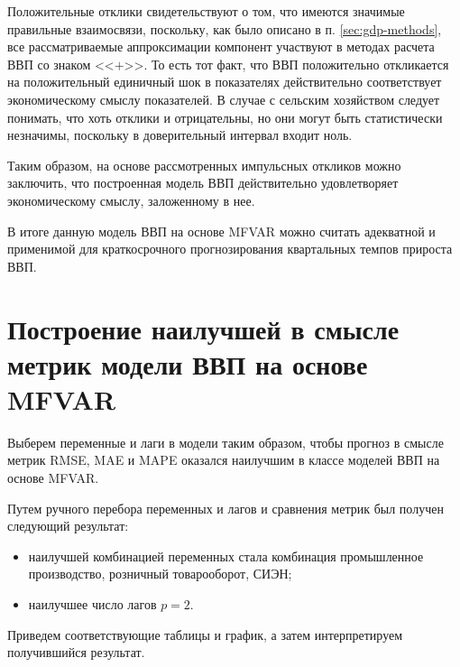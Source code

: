 \documentclass[a4paper, 14pt]{extreport}
\numberwithin{equation}{section}
\numberwithin{equation}{section}
\begin{document}
	Положительные отклики свидетельствуют о том, что имеются значимые правильные взаимосвязи, поскольку, как было описано в п. \ref{sec:gdp-methods}, все рассматриваемые аппроксимации компонент участвуют в методах расчета ВВП со знаком <<$+$>>. То есть тот факт, что ВВП положительно откликается на положительный единичный шок в показателях действительно соответствует экономическому смыслу показателей. В случае с сельским хозяйством следует понимать, что хоть отклики и отрицательны, но они могут быть статистически незначимы, поскольку в доверительный интервал входит ноль.
	
	Таким образом, на основе рассмотренных импульсных откликов можно заключить, что построенная модель ВВП действительно удовлетворяет экономическому смыслу, заложенному в нее.
	
	В итоге данную модель ВВП на основе MFVAR можно считать адекватной и применимой для краткосрочного прогнозирования квартальных темпов прироста ВВП.
	
	\section{Построение наилучшей в смысле метрик модели ВВП  на основе MFVAR}
	Выберем переменные и лаги в модели таким образом, чтобы прогноз в смысле метрик RMSE, MAE и MAPE оказался наилучшим в классе моделей ВВП на основе MFVAR.
	
	Путем ручного перебора переменных и лагов и сравнения метрик был получен следующий результат:
	\begin{itemize}
		\item наилучшей комбинацией переменных стала комбинация промышленное производство, розничный товарооборот, СИЭН;
		\item наилучшее число лагов $p = 2$.
	\end{itemize}
	Приведем соответствующие таблицы и график, а затем интерпретируем получившийся результат. 
	
\end{document}

